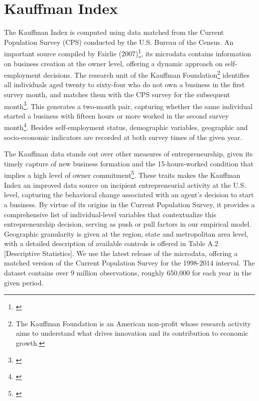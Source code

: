 \section{Kauffman Index}
The Kauffman Index is computed using data matched from the Current Population Survey (CPS) conducted by the U.S. Bureau of the Census. An important source compiled by Fairlie (2007)\footnote{\cite{Fairlie2007}}, its microdata contains information on business creation at the owner level, offering a dynamic approach on self-employment decisions. The research unit of the Kauffman Foundation\footnote{The Kauffman Foundation is an American non-profit whose research activity aims to understand what drives innovation and its contribution to economic growth. } identifies all individuals aged twenty to sixty-four who do not own a business in the first survey month, and matches them with the CPS survey for the subsequent month\footnote{\cite{Fairlie2007}}. This generates a two-month pair, capturing whether the same individual started a business with fifteen hours or more worked in the second survey month\footnote{\cite{Fairlie2007}}. Besides self-employment status, demographic variables, geographic and socio-economic indicators are recorded at both survey times of the given year. 

The Kauffman data stands out over other measures of entrepreneurship, given its timely capture of new business formation and the 15-hours-worked condition that implies a high level of owner commitment\footnote{\cite{Fairlie2007}}. These traits makes the Kauffman Index an improved data source on incipient entrepreneurial activity at the U.S. level, capturing the behavioral change associated with an agent's decision to start a business. By virtue of its origins in the Current Population Survey, it provides a comprehensive list of individual-level variables that contextualize this entrepreneurship decision, serving as push or pull factors in our empirical model. Geographic granularity is given at the region, state and metropolitan area level, with a detailed description of available controls is offered in Table A.2 [Descriptive Statistics]. We use the latest release of the microdata, offering a matched version of the Current Population Survey for the 1998-2014 interval. The dataset contains over 9 million observations, roughly 650,000 for each year in the given period.

